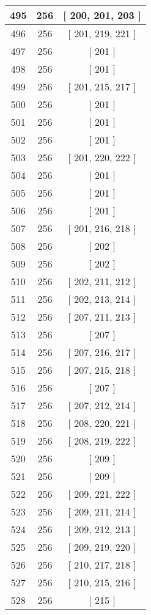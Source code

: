 \begin{center}
\begin{longtable}[H]{|| c c c ||}
\hline
495 & 256 & [ 200, 201, 203 ] \\ 
\hline
496 & 256 & [ 201, 219, 221 ] \\ 
\hline
497 & 256 & [ 201 ] \\ 
\hline
498 & 256 & [ 201 ] \\ 
\hline
499 & 256 & [ 201, 215, 217 ] \\ 
\hline
500 & 256 & [ 201 ] \\ 
\hline
501 & 256 & [ 201 ] \\ 
\hline
502 & 256 & [ 201 ] \\ 
\hline
503 & 256 & [ 201, 220, 222 ] \\ 
\hline
504 & 256 & [ 201 ] \\ 
\hline
505 & 256 & [ 201 ] \\ 
\hline
506 & 256 & [ 201 ] \\ 
\hline
507 & 256 & [ 201, 216, 218 ] \\ 
\hline
508 & 256 & [ 202 ] \\ 
\hline
509 & 256 & [ 202 ] \\ 
\hline
510 & 256 & [ 202, 211, 212 ] \\ 
\hline
511 & 256 & [ 202, 213, 214 ] \\ 
\hline
512 & 256 & [ 207, 211, 213 ] \\ 
\hline
513 & 256 & [ 207 ] \\ 
\hline
514 & 256 & [ 207, 216, 217 ] \\ 
\hline
515 & 256 & [ 207, 215, 218 ] \\ 
\hline
516 & 256 & [ 207 ] \\ 
\hline
517 & 256 & [ 207, 212, 214 ] \\ 
\hline
518 & 256 & [ 208, 220, 221 ] \\ 
\hline
519 & 256 & [ 208, 219, 222 ] \\ 
\hline
520 & 256 & [ 209 ] \\ 
\hline
521 & 256 & [ 209 ] \\ 
\hline
522 & 256 & [ 209, 221, 222 ] \\ 
\hline
523 & 256 & [ 209, 211, 214 ] \\ 
\hline
524 & 256 & [ 209, 212, 213 ] \\ 
\hline
525 & 256 & [ 209, 219, 220 ] \\ 
\hline
526 & 256 & [ 210, 217, 218 ] \\ 
\hline
527 & 256 & [ 210, 215, 216 ] \\ 
\hline
528 & 256 & [ 215 ] \\ 

\end{longtable}
\end{center}
